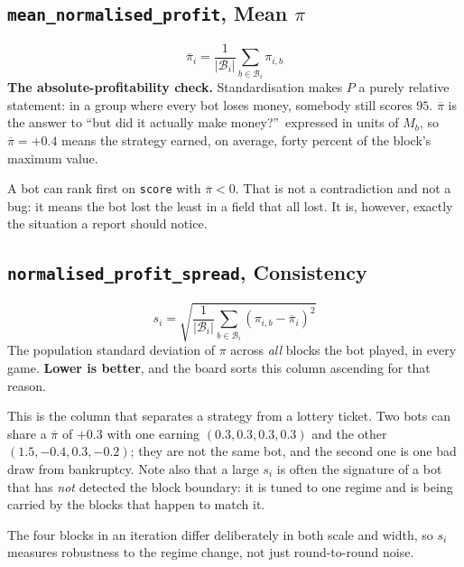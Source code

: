 \documentclass[11pt,a4paper]{article}
\newif\ifreleased
\newcommand{\code}[1]{\texttt{\small #1}}
\begin{document}
\subsection{\code{mean\_normalised\_profit}, Mean \texorpdfstring{$\pi$}{pi}}
\label{sec:meanpi}
\begin{equation}
  \boxed{\;
  \overline{\pi}_i = \frac{1}{|\mathcal{B}_i|} \sum_{b \in \mathcal{B}_i} \pi_{i,b}
  \;}
\end{equation}
\textbf{The absolute-profitability check.} Standardisation makes $P$ a purely
relative statement: in a group where every bot loses money, somebody still
scores $95$. $\overline{\pi}$ is the answer to ``but did it actually make
money?''\, expressed in units of $M_b$, so $\overline{\pi} = +0.4$ means the
strategy earned, on average, forty percent of the block's maximum value.

A bot can rank first on \code{score} with $\overline{\pi} < 0$. That is not a
contradiction and not a bug: it means the bot lost the least in a field that all
lost. It is, however, exactly the situation a report should notice.\ifreleased{}
In variations 3 and 4 it is common: those are transfer games, so the group's
total $\pi$ cannot be positive in the branch where the winner did not overpay.\fi

\subsection{\code{normalised\_profit\_spread}, Consistency}
\label{sec:consistency}
\begin{equation}
  \boxed{\;
  s_i = \sqrt{\frac{1}{|\mathcal{B}_i|}
        \sum_{b \in \mathcal{B}_i}\left(\pi_{i,b} - \overline{\pi}_i\right)^2}
  \;}
\end{equation}
The population standard deviation of $\pi$ across \emph{all} blocks the bot
played, in every game. \textbf{Lower is better}, and the board sorts this column
ascending for that reason.

This is the column that separates a strategy from a lottery ticket. Two bots can
share a $\overline{\pi}$ of $+0.3$ with one earning $(0.3, 0.3, 0.3, 0.3)$ and
the other $(1.5, -0.4, 0.3, -0.2)$; they are not the same bot, and the second
one is one bad draw from bankruptcy. Note also that a large $s_i$ is often the
signature of a bot that has \emph{not} detected the block boundary: it is tuned
to one regime and is being carried by the blocks that happen to match it.

The four blocks in an iteration differ deliberately in both scale and width, so
$s_i$ measures robustness to the regime change, not just round-to-round noise.
\end{document}
